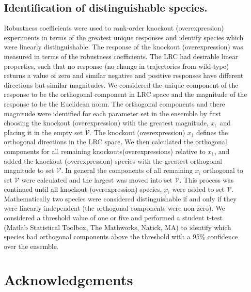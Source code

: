 \documentclass[fleqn,10pt]{wlscirep}
\begin{document}
\subsection*{Identification of distinguishable species.}
Robustness coefficients were used to rank-order knockout (overexpression) experiments in terms of the greatest unique responses and identify species which were linearly distinguishable. The response of the knockout (overexpression) was measured in terms of the robustness coefficients. The LRC had desirable linear properties, such that no response (no change in trajectories from wild-type) returns a value of zero and similar negative and positive responses have different directions but similar magnitudes. We considered the unique component of the response to be the orthogonal component in LRC space and the magnitude of the response to be the Euclidean norm. The orthogonal components and there magnitude were identified for each parameter set in the ensemble by first choosing the knockout (overexpression) with the greatest magnitude, $x_{1}$ and placing it in the empty set $\mathcal{V}$. The knockout (overexpression) $x_{1}$ defines the orthogonal directions in the LRC space. We then calculated the orthogonal components for all remaining knockouts(overexpressions) relative to $x_{1}$, and added the knockout (overexpression) species with the greatest orthogonal magnitude to set $\mathcal{V}$. In general the components of all remaining $x_{i}$ orthogonal to set $\mathcal{V}$ were calculated and the largest was moved into set $\mathcal{V}$. This process was continued until all knockout (overexpression) species, $x_{i}$ were added to set $\mathcal{V}$. Mathematically two species were considered distinguishable if and only if they were linearly independent (the orthogonal components were non-zero). We considered a threshold value of one or five and performed a student t-test (Matlab Statistical Toolbox, The Mathworks, Natick, MA) to identify which species had orthogonal components above the threshold with a 95\% confidence over the ensemble. 




\section*{Acknowledgements}
\end{document}

